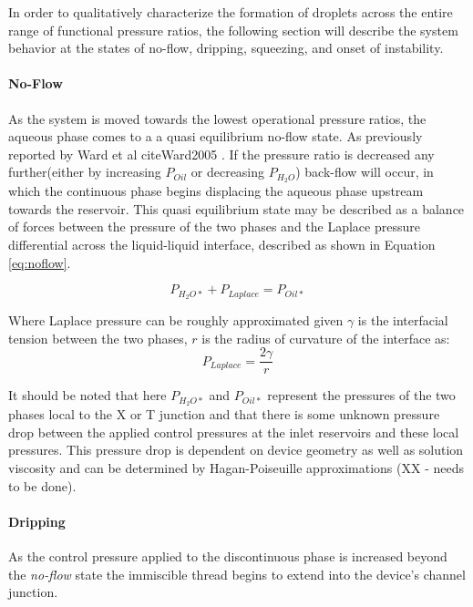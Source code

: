 In order to qualitatively characterize the formation of droplets across the entire range of functional pressure ratios, the following section will describe the system behavior at the states of no-flow, dripping, squeezing, and onset of instability.


\paragraph{No-Flow}
As the system is moved towards the lowest operational pressure ratios, the aqueous phase comes to a a quasi equilibrium no-flow state. As previously reported by Ward et al cite{Ward2005} . If the pressure ratio is decreased any further(either by increasing $P_{Oil}$ or decreasing $P_{H_2O}$) back-flow will occur, in which the continuous phase begins displacing the aqueous phase upstream towards the reservoir. This quasi equilibrium state may be described as a balance of forces between the pressure of the two phases and the Laplace pressure differential across the liquid-liquid interface, described as shown in Equation \vref{eq:noflow}.

\begin{equation}
P_{H_2O*} + P_{Laplace} = P_{Oil*} 
\label{eq:noflow}
\end{equation}

Where Laplace pressure can be roughly approximated given $\gamma$ is the interfacial tension between the two phases, $r$ is the radius of curvature of the interface as:
\begin{equation}
 P_{Laplace} = \frac{2 \gamma}{r}
\label{eq:laplace}
\end{equation}

It should be noted that here $P_{H_2O*}$ and $P_{Oil*}$ represent the pressures of the two phases local to the X or T junction and that there is some unknown pressure drop between the applied control pressures at the inlet reservoirs and these local pressures. This pressure drop is dependent on device geometry as well as solution viscosity and can be determined by Hagan-Poiseuille approximations (XX - needs to be done). 
 
\paragraph{Dripping}

As the control pressure applied to the discontinuous phase is increased beyond the \emph{no-flow} state the immiscible thread begins to extend into the device's channel junction. 


